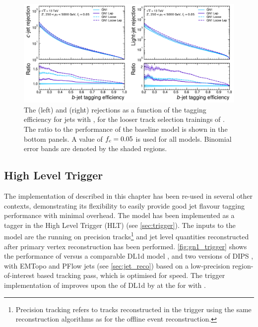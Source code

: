 \begin{figure}[!p]
    \centering
    \includegraphics[width=\textwidth]{chapters/gnn_tagger/figs/gn1_loose_zprime.pdf}
    \caption{
        The \cjet (left) and \ljet (right) rejections as a function of the \bjet tagging efficiency for \Zprime jets with \Zprimept, for the looser track selection trainings of \GNN.
        The ratio to the performance of the baseline \GNN model is shown in the bottom panels.
        A value of $f_c = 0.05$ is used for all models.
        Binomial error bands are denoted by the shaded regions.
    }
    \label{fig:zprime_gn1_loose}
\end{figure}


\subsection{High Level Trigger}\label{sec:gnn_trig}

The implementation of \GNN described in this chapter has been re-used in several other contexts, demonstrating its flexibility to easily provide good jet flavour tagging performance with minimal overhead.
The model has been implemented as a \bjet tagger in the High Level Trigger (HLT) (see \cref{sec:trigger}).
The inputs to the model are the running on precision tracks\footnote{Precision tracking refers to tracks reconstructed in the trigger using the same reconstruction algorithms as for the offline event reconstruction.} and jet level quantities reconstructed after primary vertex reconstruction has been performed.
\cref{fig:gn1_trigger} shows the performance of \GNN versus a comparable DL1d model \cite{ATLAS:2022qxm}, and two versions of DIPS \cite{ATL-PHYS-PUB-2020-014}, with EMTopo and PFlow jets (see \cref{sec:jet_reco}) based on a low-precision region-of-interest based tracking pass, which is optimised for speed.
The trigger implementation of \GNN improves upon the \lrej of DL1d by  at the  for \ttbarjets with \ttbarpt.

